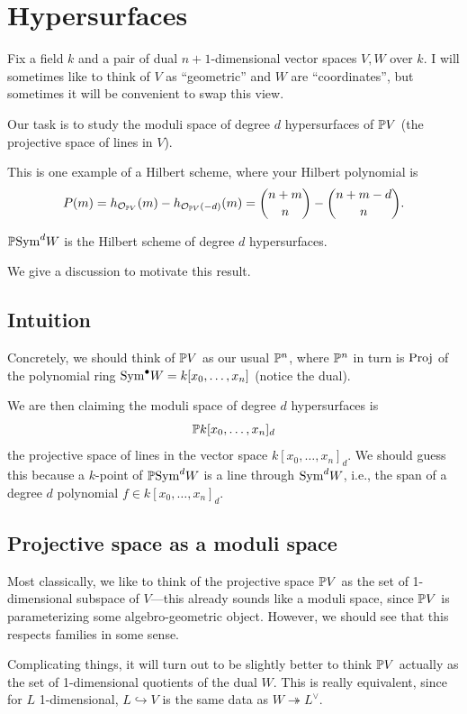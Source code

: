 \documentclass[12pt]{article}
\begin{document}
\section{Hypersurfaces}

Fix a field $k$ and a pair of dual $n+1$-dimensional vector spaces $V,W$ over $k$. I will sometimes like to think of $V$ as ``geometric'' and $W$ are ``coordinates'', but sometimes it will be convenient to swap this view.

Our task is to study the moduli space of degree $d$ hypersurfaces of $\P V$ (the projective space of lines in $V$).

This is one example of a Hilbert scheme, where your Hilbert polynomial is
\[P(m) = h_{\cO_{\P V}}(m) - h_{\cO_{\P V}(-d)}(m) = \binom{n+m}{n} - \binom{n+m-d}{n}.\]

\begin{prop}
    $\P \Sym^d W$ is the Hilbert scheme of degree $d$ hypersurfaces.
\end{prop}

We give a discussion to motivate this result.

\subsection{Intuition}

Concretely, we should think of $\P V$ as our usual $\P^n$, where $\P^n$ in turn is $\Proj$ of the polynomial ring $\Sym^\bullet W = k[x_0,\dots,x_n]$ (notice the dual).

We are then claiming the moduli space of degree $d$ hypersurfaces is
\[\P k[x_0,\dots,x_n]_d\]
the projective space of lines in the vector space $k[x_0,\dots,x_n]_d$. We should guess this because a $k$-point of $\P \Sym^d W$ is a line through $\Sym^d W$, i.e., the span of a degree $d$ polynomial $f\in k[x_0,\dots,x_n]_d$.

\subsection{Projective space as a moduli space}

Most classically, we like to think of the projective space $\P V$ as the set of 1-dimensional subspace of $V$---this already sounds like a moduli space, since $\P V$ is parameterizing some algebro-geometric object. However, we should see that this respects families in some sense.

Complicating things, it will turn out to be slightly better to think $\P V$ actually as the set of 1-dimensional quotients of the dual $W$. This is really equivalent, since for $L$ 1-dimensional, $L \hookrightarrow V$ is the same data as $W \twoheadrightarrow L^\vee$.
\end{document}
